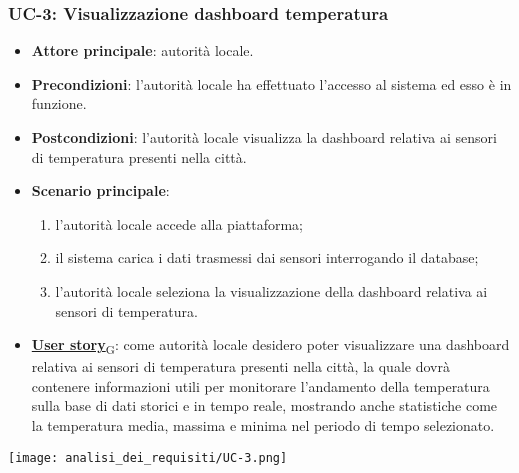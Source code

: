 \subsubsection{UC-3: Visualizzazione dashboard temperatura}
\begin{itemize}
	\item \textbf{Attore principale}: autorità locale.
	\item \textbf{Precondizioni}: l'autorità locale ha effettuato l'accesso al sistema ed esso è in funzione.
	\item \textbf{Postcondizioni}: l'autorità locale visualizza la dashboard relativa
	      ai sensori di temperatura presenti nella città.
	\item \textbf{Scenario principale}:
	      \begin{enumerate}
		      \item l'autorità locale accede alla piattaforma;
		      \item il sistema carica i dati trasmessi dai sensori interrogando il database;
		      \item l'autorità locale seleziona la visualizzazione della dashboard relativa ai sensori di temperatura.
	      \end{enumerate}
	\item \href{https://7last.github.io/docs/rtb/documentazione-interna/glossario\#user-story}{\textbf{User story}\textsubscript{G}}:
	      come autorità locale desidero poter visualizzare una dashboard relativa ai sensori di temperatura presenti nella città, la quale
	      dovrà contenere informazioni utili per monitorare l'andamento della temperatura sulla base di dati storici e in tempo reale, mostrando
	      anche statistiche come la temperatura media, massima e minima nel periodo di tempo selezionato.
\end{itemize}
\begin{center}
	\texttt{[image: analisi\_dei\_requisiti/UC-3.png]}
\end{center}


